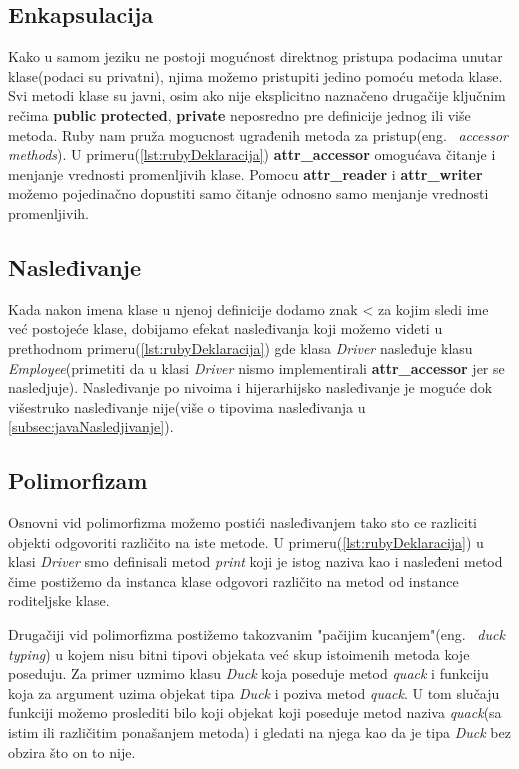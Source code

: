 \documentclass[a4paper]{article}
\begin{document}
\subsection{Enkapsulacija}
\label{subsec:rubyEnkapsulacija}
Kako u samom jeziku ne postoji mogućnost direktnog pristupa podacima unutar klase(podaci su privatni), njima možemo pristupiti jedino pomoću metoda klase. Svi metodi klase su javni, osim ako nije eksplicitno naznačeno drugačije ključnim rečima \textbf{public} \textbf{protected}, \textbf{private} neposredno pre definicije jednog ili više metoda. Ruby nam pruža mogucnost ugrađenih metoda za pristup(eng. ~{\em accessor methods}). U primeru(\ref{lst:rubyDeklaracija})  \textbf{attr\_accessor} omogućava čitanje i menjanje vrednosti promenljivih klase. Pomocu \textbf{attr\_reader} i \textbf{attr\_writer} možemo pojedinačno dopustiti samo čitanje odnosno samo menjanje vrednosti promenljivih.

\subsection{Nasleđivanje}
\label{subsec:rubyNasledjivanje}
Kada nakon imena klase u njenoj definicije dodamo znak < za kojim sledi ime već postojeće klase, dobijamo efekat nasleđivanja koji možemo videti u prethodnom primeru(\ref{lst:rubyDeklaracija}) gde klasa \textit{Driver} nasleđuje klasu \textit{Employee}(primetiti da u klasi \textit{Driver} nismo implementirali \textbf{attr\_accessor} jer se nasledjuje). Nasleđivanje po nivoima i hijerarhijsko nasleđivanje je moguće dok višestruko nasleđivanje nije(više o tipovima nasleđivanja u \ref{subsec:javaNasledjivanje}).

\subsection{Polimorfizam}
\label{subsec:rubyPolimorfizam}
Osnovni vid polimorfizma možemo postići nasleđivanjem tako sto ce razliciti objekti odgovoriti različito na iste metode. U primeru(\ref{lst:rubyDeklaracija}) u klasi \textit{Driver} smo definisali metod \textit{print} koji je istog naziva kao i nasleđeni metod čime postižemo da instanca klase odgovori različito na metod od instance roditeljske klase. 

Drugačiji vid polimorfizma postižemo takozvanim "pačijim kucanjem"(eng. ~{\em duck typing}) u kojem nisu bitni tipovi objekata već skup istoimenih metoda koje poseduju. Za primer uzmimo klasu \textit{Duck} koja poseduje metod  \textit{quack} i funkciju koja za argument uzima objekat tipa \textit{Duck} i poziva metod \textit{quack}. U tom slučaju funkciji možemo proslediti bilo koji objekat koji poseduje metod naziva \textit{quack}(sa istim ili različitim ponašanjem metoda) i gledati na njega kao da je tipa \textit{Duck} bez obzira što on to nije.
\end{document}
